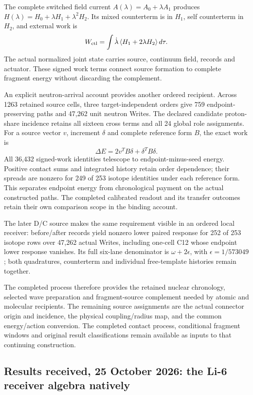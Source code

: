 The complete switched field current \(A(\lambda)=A_0+\lambda A_1\)
produces \(H(\lambda)=H_0+\lambda H_1+\lambda^2H_2\).
Its mixed counterterm is in \(H_1\), self counterterm in \(H_2\), and
external work is
\[
 W_{\rm ctl}=\int\dot\lambda\,
       \langle H_1+2\lambda H_2\rangle\,d\tau.
\]
The actual normalized joint state carries source, continuum field,
records and actuator. These signed work terms connect source formation
to complete fragment energy without discarding the complement.

An explicit neutron-arrival account provides another ordered recipient.
Across 1263 retained source cells, three target-independent orders give
759 endpoint-preserving paths and 47,262 unit neutron Writes.
The declared candidate proton-share incidence retains all sixteen
cross terms and all 24 global role assignments. For a source vector \(v\),
increment \(\delta\) and complete reference form \(B\), the exact work is
\[
 \Delta E=2v^TB\delta+\delta^TB\delta.
\]
All 36,432 signed-work identities telescope to endpoint-minus-seed energy.
Positive contact sums and integrated history retain order dependence;
their spreads are nonzero for 249 of 253 isotope identities under each
reference form. This separates endpoint energy from chronological payment
on the actual constructed paths. The completed calibrated readout and its
transfer outcomes retain their own comparison scope in the binding account.

The later D/C source makes the same requirement visible in an ordered
local receiver: before/after records yield nonzero lower paired response
for 252 of 253 isotope rows over 47,262 actual Writes, including one-cell
C12 whose endpoint lower response vanishes. Its full six-lane denominator
is \(\omega+2\epsilon\), with \(\epsilon=1/573049\); both quadratures,
counterterm and individual free-template histories remain together.

The completed process therefore provides the retained nuclear chronology,
selected wave preparation and fragment-source complement needed by
atomic and molecular recipients. The remaining source assignments are
the actual connector origin and incidence, the physical coupling/radius
map, and the common energy/action conversion. The completed contact
process, conditional fragment windows and original result classifications
remain available as inputs to that continuing construction.

\subsection{Results received, 25 October 2026: the Li-6 receiver algebra natively}
\label{v2c12:received}


